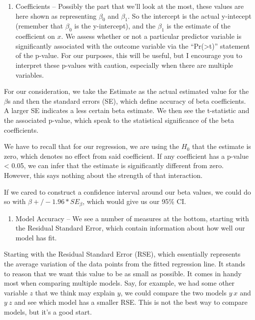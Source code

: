 \documentclass[
]{article}
\providecommand{\tightlist}{%
  \setlength{\itemsep}{0pt}\setlength{\parskip}{0pt}}
\begin{document}
\begin{enumerate}
\def\labelenumi{\arabic{enumi}.}
\setcounter{enumi}{2}
\tightlist
\item
  Coefficients -- Possibly the part that we'll look at the most, these
  values are here shown as representing \(\beta_0\) and \(\beta_1\). So
  the intercept is the actual y-intecept (remember that \(\beta_0\) is
  the y-intercept), and the \(\beta_1\) is the estimate of the
  coefficient on \(x\). We assess whether or not a particular predictor
  variable is significantly associated with the outcome variable via the
  ``Pr(\textgreater\textbar t\textbar)'' statement of the p-value. For
  our purposes, this will be useful, but I encourage you to interpret
  these p-values with caution, especially when there are multiple
  variables.
\end{enumerate}

For our consideration, we take the Estimate as the actual estimated
value for the \(\beta\)s and then the standard errors (SE), which define
accuracy of beta coefficients. A larger SE indicates a less certain beta
estimate. We then see the t-statistic and the associated p-value, which
speak to the statistical significance of the beta coefficients.

We have to recall that for our regression, we are using the \(H_0\) that
the estimate is zero, which denotes no effect from said coefficient. If
any coefficient has a p-value \textless{} 0.05, we can infer that the
estimate is significantly different from zero. However, this says
nothing about the strength of that interaction.

If we cared to construct a confidence interval around our beta values,
we could do so with \(\beta +/- 1.96 * SE_{\beta}\), which would give us
our 95\% CI.

\begin{enumerate}
\def\labelenumi{\arabic{enumi}.}
\setcounter{enumi}{3}
\tightlist
\item
  Model Accuracy -- We see a number of measures at the bottom, starting
  with the Residual Standard Error, which contain information about how
  well our model has fit.
\end{enumerate}

Starting with the Residual Standard Error (RSE), which essentially
represents the average variation of the data points from the fitted
regression line. It stands to reason that we want this value to be as
small as possible. It comes in handy most when comparing multiple
models. Say, for example, we had some other variable \(z\) that we think
may explain \(y\), we could compare the two models \(y ~ x\) and
\(y ~ z\) and see which model has a smaller RSE. This is not the best
way to compare models, but it's a good start.
\end{document}
